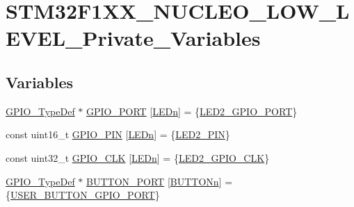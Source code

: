\hypertarget{group___s_t_m32_f1_x_x___n_u_c_l_e_o___l_o_w___l_e_v_e_l___private___variables}{}\section{S\+T\+M32\+F1\+X\+X\+\_\+\+N\+U\+C\+L\+E\+O\+\_\+\+L\+O\+W\+\_\+\+L\+E\+V\+E\+L\+\_\+\+Private\+\_\+\+Variables}
\label{group___s_t_m32_f1_x_x___n_u_c_l_e_o___l_o_w___l_e_v_e_l___private___variables}
\subsection*{Variables}
\begin{DoxyCompactItemize}
\item 
\mbox{\hyperlink{struct_g_p_i_o___type_def}{G\+P\+I\+O\+\_\+\+Type\+Def}} $\ast$ \mbox{\hyperlink{group___s_t_m32_f1_x_x___n_u_c_l_e_o___l_o_w___l_e_v_e_l___private___variables_gadfddcc182c40163aaa7b3c7f36e42ed9}{G\+P\+I\+O\+\_\+\+P\+O\+RT}} \mbox{[}\mbox{\hyperlink{group___s_t_m32_f1_x_x___n_u_c_l_e_o___l_o_w___l_e_v_e_l___l_e_d_gab4be2480bf7d44d52aab1190a65a733c}{L\+E\+Dn}}\mbox{]} = \{\mbox{\hyperlink{group___s_t_m32_f1_x_x___n_u_c_l_e_o___l_o_w___l_e_v_e_l___l_e_d_gaf88822ae4b79d37c7735ce1160b59f68}{L\+E\+D2\+\_\+\+G\+P\+I\+O\+\_\+\+P\+O\+RT}}\}
\item 
const uint16\+\_\+t \mbox{\hyperlink{group___s_t_m32_f1_x_x___n_u_c_l_e_o___l_o_w___l_e_v_e_l___private___variables_ga7f675ed2b6edb74e2d8406f8a4a677f5}{G\+P\+I\+O\+\_\+\+P\+IN}} \mbox{[}\mbox{\hyperlink{group___s_t_m32_f1_x_x___n_u_c_l_e_o___l_o_w___l_e_v_e_l___l_e_d_gab4be2480bf7d44d52aab1190a65a733c}{L\+E\+Dn}}\mbox{]} = \{\mbox{\hyperlink{group___s_t_m32_f1_x_x___n_u_c_l_e_o___l_o_w___l_e_v_e_l___l_e_d_gaf6f84078113b55354d20585131b386f7}{L\+E\+D2\+\_\+\+P\+IN}}\}
\item 
const uint32\+\_\+t \mbox{\hyperlink{group___s_t_m32_f1_x_x___n_u_c_l_e_o___l_o_w___l_e_v_e_l___private___variables_gaeef08b09ae717d36fdb4693a58ae0261}{G\+P\+I\+O\+\_\+\+C\+LK}} \mbox{[}\mbox{\hyperlink{group___s_t_m32_f1_x_x___n_u_c_l_e_o___l_o_w___l_e_v_e_l___l_e_d_gab4be2480bf7d44d52aab1190a65a733c}{L\+E\+Dn}}\mbox{]} = \{\mbox{\hyperlink{group___s_t_m32_f1_x_x___n_u_c_l_e_o___l_o_w___l_e_v_e_l___l_e_d_ga972d10beb8aa0aa7a6edf70e5a6200ff}{L\+E\+D2\+\_\+\+G\+P\+I\+O\+\_\+\+C\+LK}}\}
\item 
\mbox{\hyperlink{struct_g_p_i_o___type_def}{G\+P\+I\+O\+\_\+\+Type\+Def}} $\ast$ \mbox{\hyperlink{group___s_t_m32_f1_x_x___n_u_c_l_e_o___l_o_w___l_e_v_e_l___private___variables_gad63ed42b4071e78f80f7462227da4f35}{B\+U\+T\+T\+O\+N\+\_\+\+P\+O\+RT}} \mbox{[}\mbox{\hyperlink{group___s_t_m32_f1_x_x___n_u_c_l_e_o___l_o_w___l_e_v_e_l___b_u_t_t_o_n_ga43d47e509ada64329393005c3be15d64}{B\+U\+T\+T\+O\+Nn}}\mbox{]} = \{\mbox{\hyperlink{group___s_t_m32_f1_x_x___n_u_c_l_e_o___l_o_w___l_e_v_e_l___b_u_t_t_o_n_gae2e6fc2fdfda22b4eed3667375a8bd81}{U\+S\+E\+R\+\_\+\+B\+U\+T\+T\+O\+N\+\_\+\+G\+P\+I\+O\+\_\+\+P\+O\+RT}}\}

\end{DoxyCompactItemize}
